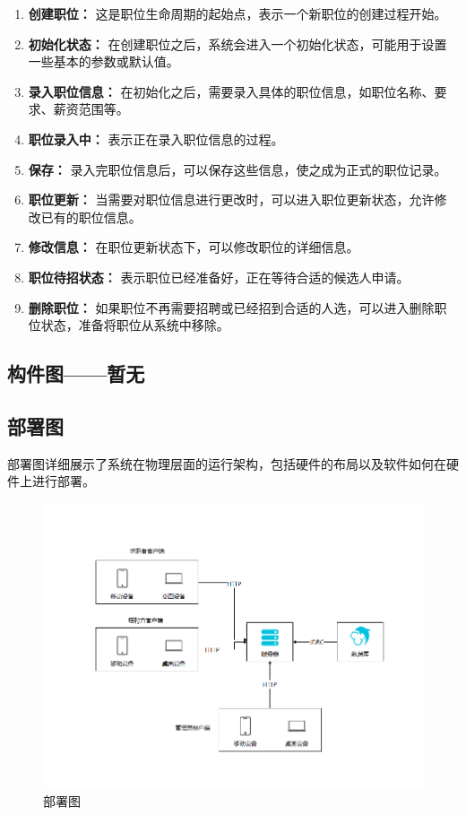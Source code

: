 \documentclass[UTF8,a4paper,10pt]{ctexart}
\begin{document}
\begin{enumerate}
    \item \textbf{创建职位：} 这是职位生命周期的起始点，表示一个新职位的创建过程开始。
    \item \textbf{初始化状态：} 在创建职位之后，系统会进入一个初始化状态，可能用于设置一些基本的参数或默认值。
    \item \textbf{录入职位信息：} 在初始化之后，需要录入具体的职位信息，如职位名称、要求、薪资范围等。
    \item \textbf{职位录入中：} 表示正在录入职位信息的过程。
    \item \textbf{保存：} 录入完职位信息后，可以保存这些信息，使之成为正式的职位记录。
    \item \textbf{职位更新：} 当需要对职位信息进行更改时，可以进入职位更新状态，允许修改已有的职位信息。
    \item \textbf{修改信息：} 在职位更新状态下，可以修改职位的详细信息。
    \item \textbf{职位待招状态：} 表示职位已经准备好，正在等待合适的候选人申请。
    \item \textbf{删除职位：} 如果职位不再需要招聘或已经招到合适的人选，可以进入删除职位状态，准备将职位从系统中移除。
\end{enumerate}

\subsection{构件图——暂无}

\subsection{部署图}

部署图详细展示了系统在物理层面的运行架构，包括硬件的布局以及软件如何在硬件上进行部署。

\begin{figure}[H]
    \centering
    \includegraphics[width=\textwidth]{img/部署图.png} 
    \caption{部署图}
    \label{fig:部署图}
\end{figure}
\end{document}
